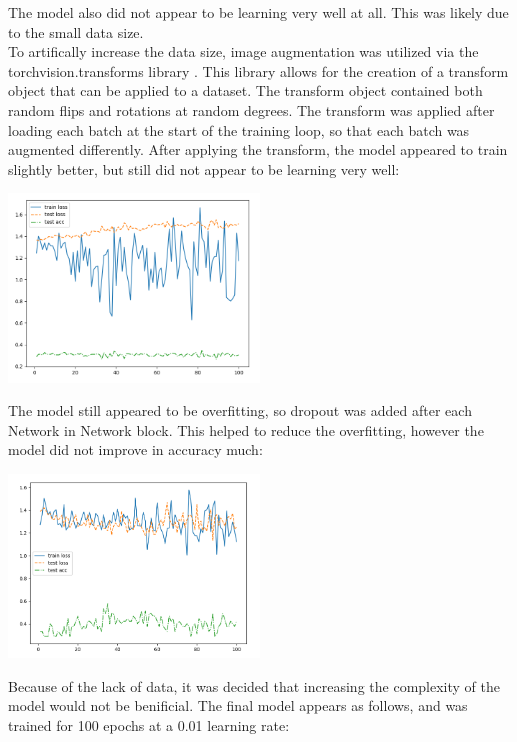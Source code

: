 \documentclass{article}[12pt]
\begin{document}
\indent
The model also did not appear to be learning very well at all. This was likely due to the small data size.\\
\indent
To artifically increase the data size, image augmentation was utilized via the torchvision.transforms library \cite{transforms}. This library allows for the creation of a transform object that can be applied to a dataset. The transform object contained both random flips and rotations at random degrees. The transform was applied after loading each batch at the start of the training loop, so that each batch was augmented differently. After applying the transform, the model appeared to train slightly better, but still did not appear to be learning very well:\\
\begin{center}
    \includegraphics[width=0.5\textwidth]{images/basic_model_augmented.png}
\end{center}
The model still appeared to be overfitting, so dropout was added after each Network in Network block. This helped to reduce the overfitting, however the model did not improve in accuracy much:\\
\begin{center}
    \includegraphics[width=0.5\textwidth]{images/model_augmented_dropout.png}
\end{center}
\indent
Because of the lack of data, it was decided that increasing the complexity of the model would not be benificial. The final model appears as follows, and was trained for 100 epochs at a 0.01 learning rate:\\
\end{document}
